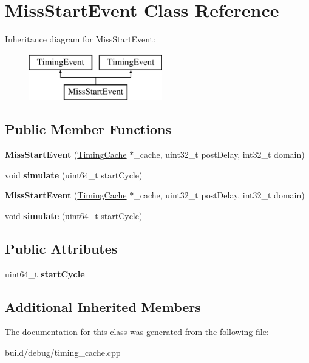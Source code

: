 \hypertarget{classMissStartEvent}{\section{Miss\-Start\-Event Class Reference}
\label{classMissStartEvent}
}
Inheritance diagram for Miss\-Start\-Event\-:\begin{figure}[H]
\begin{center}
\leavevmode
\includegraphics[height=2.000000cm]{classMissStartEvent}
\end{center}
\end{figure}
\subsection*{Public Member Functions}
\begin{DoxyCompactItemize}
\item 
\hypertarget{classMissStartEvent_aec85a6040c98eb304cd4431e044934a7}{{\bfseries Miss\-Start\-Event} (\hyperlink{classTimingCache}{Timing\-Cache} $\ast$\-\_\-cache, uint32\-\_\-t post\-Delay, int32\-\_\-t domain)}\label{classMissStartEvent_aec85a6040c98eb304cd4431e044934a7}

\item 
\hypertarget{classMissStartEvent_a690b99ec91256750af674ce937d334a8}{void {\bfseries simulate} (uint64\-\_\-t start\-Cycle)}\label{classMissStartEvent_a690b99ec91256750af674ce937d334a8}

\item 
\hypertarget{classMissStartEvent_aec85a6040c98eb304cd4431e044934a7}{{\bfseries Miss\-Start\-Event} (\hyperlink{classTimingCache}{Timing\-Cache} $\ast$\-\_\-cache, uint32\-\_\-t post\-Delay, int32\-\_\-t domain)}\label{classMissStartEvent_aec85a6040c98eb304cd4431e044934a7}

\item 
\hypertarget{classMissStartEvent_a690b99ec91256750af674ce937d334a8}{void {\bfseries simulate} (uint64\-\_\-t start\-Cycle)}\label{classMissStartEvent_a690b99ec91256750af674ce937d334a8}

\end{DoxyCompactItemize}
\subsection*{Public Attributes}
\begin{DoxyCompactItemize}
\item 
\hypertarget{classMissStartEvent_adb06a8fb059679c0f222f647be6bbab8}{uint64\-\_\-t {\bfseries start\-Cycle}}\label{classMissStartEvent_adb06a8fb059679c0f222f647be6bbab8}

\end{DoxyCompactItemize}
\subsection*{Additional Inherited Members}


The documentation for this class was generated from the following file\-:\begin{DoxyCompactItemize}
\item 
build/debug/timing\-\_\-cache.\-cpp\end{DoxyCompactItemize}
